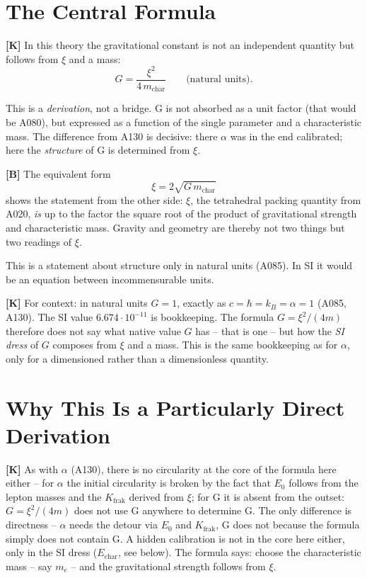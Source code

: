 \section{The Central Formula}

\textbf{[K]} In this theory the gravitational constant is not an independent
quantity but follows from $\xi$ and a mass:
\[
  G = \frac{\xi^2}{4\,m_\text{char}} \qquad\text{(natural units)}.
\]

This is a \emph{derivation}, not a bridge. G is not absorbed as a unit factor
(that would be A080), but expressed as a function of the single parameter and
a characteristic mass. The difference from A130 is decisive: there $\alpha$
was in the end calibrated; here the \emph{structure} of G is determined from $\xi$.

\textbf{[B]} The equivalent form
\[
  \xi = 2\sqrt{G\,m_\text{char}}
\]
shows the statement from the other side: $\xi$, the tetrahedral packing quantity
from A020, \emph{is} up to the factor the square root of the product of
gravitational strength and characteristic mass. Gravity and geometry are thereby
not two things but two readings of $\xi$.

This is a statement about structure only in natural units (A085). In SI it would
be an equation between incommensurable units.

\textbf{[K]} For context: in natural units $G = 1$, exactly as
$c = \hbar = k_B = \alpha = 1$ (A085, A130). The SI value $6{.}674\cdot10^{-11}$
is bookkeeping. The formula $G = \xi^2/(4m)$ therefore does not say what native
value $G$ has -- that is one -- but how the \emph{SI dress} of $G$ composes from
$\xi$ and a mass. This is the same bookkeeping as for $\alpha$, only for a
dimensioned rather than a dimensionless quantity.

\section{Why This Is a Particularly Direct Derivation}

\textbf{[K]} As with $\alpha$ (A130), there is no circularity at the core
of the formula here either -- for $\alpha$ the initial circularity is broken by
the fact that $E_0$ follows from the lepton masses and the $K_\text{frak}$
derived from $\xi$; for G it is absent from the outset:
$G = \xi^2/(4m)$ does not use G anywhere to determine G.
The only difference is directness -- $\alpha$ needs the detour via $E_0$ and
$K_\text{frak}$, G does not because the formula simply does not contain G.
A hidden calibration
is not in the core here either, only in the SI dress ($E_\text{char}$, see below).
The formula says: choose the characteristic mass -- say $m_e$ -- and the
gravitational strength follows from $\xi$.

